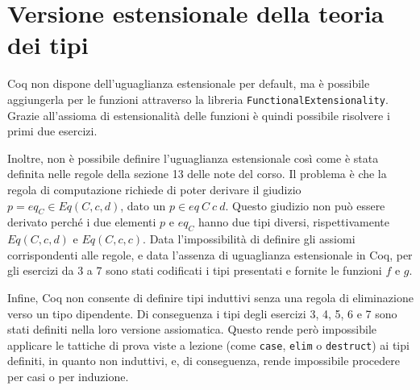 \newpage
\section{Versione estensionale della teoria dei tipi}
Coq non dispone dell'uguaglianza estensionale per default, ma è possibile aggiungerla per le funzioni attraverso la libreria \texttt{FunctionalExtensionality}. Grazie all'assioma di estensionalità delle funzioni è quindi possibile risolvere i primi due esercizi.

Inoltre, non è possibile definire l'uguaglianza estensionale così come è stata definita nelle regole della sezione 13 delle note del corso. Il problema è che la regola di computazione richiede di poter derivare il giudizio $p=eq_C\in Eq(C,c,d)$, dato un $p\in eq~C~c~d$. Questo giudizio non può essere derivato perché i due elementi $p $ e $eq_C$ hanno due tipi diversi, rispettivamente $Eq(C,c,d)$ e $Eq(C,c,c)$. Data l'impossibilità di definire gli assiomi corrispondenti alle regole, e data l'assenza di uguaglianza estensionale in Coq, per gli esercizi da 3 a 7 sono stati codificati i tipi presentati e fornite le funzioni $f$ e $g$.

Infine, Coq non consente di definire tipi induttivi senza una regola di eliminazione verso un tipo dipendente. Di conseguenza i tipi degli esercizi 3, 4, 5, 6 e 7 sono stati definiti nella loro versione assiomatica. Questo rende però impossibile applicare le tattiche di prova viste a lezione (come \texttt{case}, \texttt{elim} o \texttt{destruct}) ai tipi definiti, in quanto non induttivi, e, di conseguenza, rende impossibile procedere per casi o per induzione.

%

